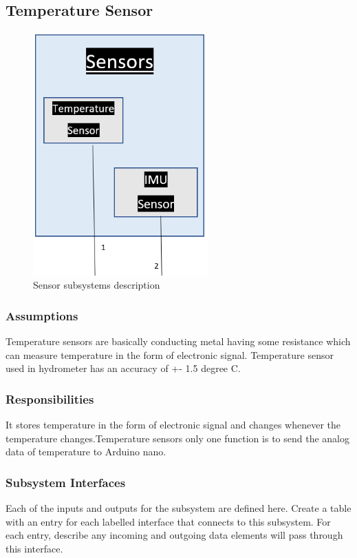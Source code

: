 \subsection{Temperature Sensor}

\begin{figure}[h!]
	\centering
 	\includegraphics[width=0.60\textwidth]{images/Sensors subsystems}
 \caption{Sensor subsystems description}
\end{figure}

\subsubsection{Assumptions}
Temperature sensors are basically conducting metal having some resistance which can measure temperature in the form of electronic signal. Temperature sensor used in hydrometer has an accuracy of +- 1.5 degree C.

\subsubsection{Responsibilities}
It stores temperature in the form of  electronic signal and changes whenever the temperature changes.Temperature sensors only one function is to send the analog data of temperature to Arduino nano. 

\subsubsection{Subsystem Interfaces}
Each of the inputs and outputs for the subsystem are defined here. Create a table with an entry for each labelled interface that connects to this subsystem. For each entry, describe any incoming and outgoing data elements will pass through this interface.

